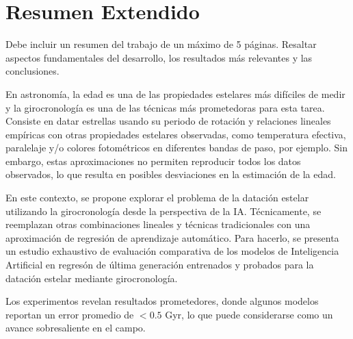 \chapter{Resumen Extendido}
Debe incluir un resumen del trabajo de un máximo de 5 páginas. Resaltar aspectos fundamentales del desarrollo, los resultados más relevantes y las conclusiones.


En astronomía, la edad es una de las propiedades estelares más difíciles de medir y la girocronología es una de las técnicas más prometedoras para esta tarea. Consiste en datar estrellas usando su periodo de rotación y relaciones lineales empíricas con otras propiedades estelares observadas, como temperatura efectiva, paralelaje y/o colores fotométricos en diferentes bandas de paso, por ejemplo. Sin embargo, estas aproximaciones no permiten reproducir todos los datos observados, lo que resulta en posibles desviaciones en la estimación de la edad.

En este contexto, se propone explorar el problema de la datación estelar utilizando la girocronología desde la perspectiva de la IA. Técnicamente, se reemplazan otras combinaciones lineales y técnicas tradicionales con una aproximación de regresión de aprendizaje automático. Para hacerlo, se presenta un estudio exhaustivo de evaluación comparativa de los modelos de Inteligencia Artificial en regresón de última generación entrenados y probados para la datación estelar mediante girocronología.

Los experimentos revelan resultados prometedores, donde algunos modelos reportan un error promedio de $<0.5$ Gyr, lo que puede considerarse como un avance sobresaliente en el campo.

